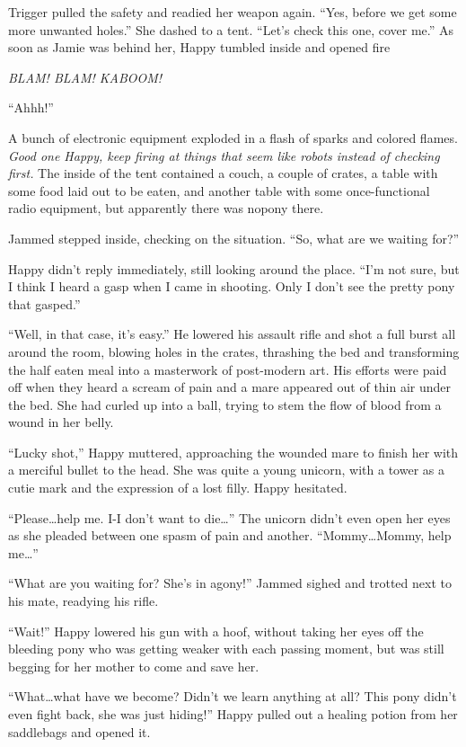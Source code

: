 Trigger pulled the safety and readied her weapon again. ``Yes, before we get some more unwanted holes.'' She dashed to a tent. ``Let's check this one, cover me.'' As soon as Jamie was behind her, Happy tumbled inside and opened fire

\emph{BLAM! BLAM! KABOOM!}

 ``Ahhh!''

A bunch of electronic equipment exploded in a flash of sparks and colored flames. \emph{Good one Happy, keep firing at things that seem like robots instead of checking first.}\/ The inside of the tent contained a couch, a couple of crates, a table with some food laid out to be eaten, and another table with some once-functional radio equipment, but apparently there was nopony there.

Jammed stepped inside, checking on the situation. ``So, what are we waiting for?''

Happy didn't reply immediately, still looking around the place. ``I'm not sure, but I think I heard a gasp when I came in shooting. Only I don't see the pretty pony that gasped.''

``Well, in that case, it's easy.'' He lowered his assault rifle and shot a full burst all around the room, blowing holes in the crates, thrashing the bed and transforming the half eaten meal into a masterwork of post-modern art. His efforts were paid off when they heard a scream of pain and a mare appeared out of thin air under the bed. She had curled up into a ball, trying to stem the flow of blood from a wound in her belly.

``Lucky shot,'' Happy muttered, approaching the wounded mare to finish her with a merciful bullet to the head. She was quite a young unicorn, with a tower as a cutie mark and the expression of a lost filly. Happy hesitated.

``Please\dots help me. I-I don't want to die\dots'' The unicorn didn't even open her eyes as she pleaded between one spasm of pain and another. ``Mommy\dots Mommy, help me\dots''

``What are you waiting for? She's in agony!'' Jammed sighed and trotted next to his mate, readying his rifle.

``Wait!'' Happy lowered his gun with a hoof, without taking her eyes off the bleeding pony who was getting weaker with each passing moment, but was still begging for her mother to come and save her.

``What\dots what have we become? Didn't we learn anything at all? This pony didn't even fight back, she was just hiding!'' Happy pulled out a healing potion from her saddlebags and opened it.

